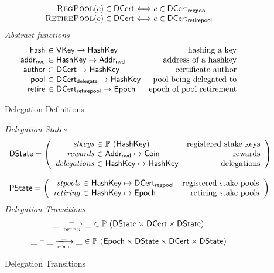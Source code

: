 \documentclass[11pt,a4paper]{article}
\newcommand{\powerset}[1]{\mathbb{P}~#1}
\newcommand{\var}[1]{\mathit{#1}}
\newcommand{\fun}[1]{\mathsf{#1}}
\newcommand{\type}[1]{\mathsf{#1}}
\newcommand{\trans}[2]{\xlongrightarrow[\textsc{#1}]{#2}}
\newcommand{\AddrRWD}{\type{Addr_{rwd}}}
\newcommand{\VKey}{\type{VKey}}
\newcommand{\HashKey}{\type{HashKey}}
\newcommand{\Coin}{\type{Coin}}
\newcommand{\Epoch}{\type{Epoch}}
\newcommand{\DState}{\type{DState}}
\newcommand{\PState}{\type{PState}}
\newcommand{\DCert}{\type{DCert}}
\newcommand{\DCertDeleg}{\type{DCert_{delegate}}}
\newcommand{\DCertRegPool}{\type{DCert_{regpool}}}
\newcommand{\DCertRetirePool}{\type{DCert_{retirepool}}}
\newcommand{\RegPool}[1]{\textsc{RegPool}(#1)}
\newcommand{\RetirePool}[1]{\textsc{RetirePool}(#1)}
\begin{document}
\begin{figure}
\begin{equation*}
\begin{array}{r@{}c@{}l}
    \RegPool{c} \in \DCert &\iff& c \in \DCertRegPool\\
    \RetirePool{c} \in \DCert &\iff& c \in \DCertRetirePool \\
  \end{array}
  \end{equation*}
  \emph{Abstract functions}
  \begin{equation*}
  \begin{array}{r@{~\in~}lr}
  \fun{hash} & \VKey \to \HashKey
  & \text{hashing a key}
  \\
  \fun{addr_{rwd}} & \HashKey \to \AddrRWD
  & \text{address of a hashkey}
  \\
  \fun{author} & \DCert \to \HashKey
  & \text{certificate author}
  \\
  \fun{pool} & \DCertDeleg \to \HashKey
  & \text{pool being delegated to}
  \\
  \fun{retire} & \DCertRetirePool \to \Epoch
  & \text{epoch of pool retirement}
  \end{array}
  \end{equation*}

  \caption{Delegation Definitions}
  \label{fig:delegation-definitons}
\end{figure}

\begin{figure}
  \emph{Delegation States}
  \begin{equation*}
    \begin{array}{l}
    \DState =
    \left(\begin{array}{r@{~\in~}lr}
      \var{stkeys} & \powerset (\HashKey) & \text{registered stake keys}\\
      \var{rewards} & \AddrRWD \mapsto \Coin & \text{rewards}\\
      \var{delegations} & \HashKey \mapsto \HashKey & \text{delegations}\\
    \end{array}\right)
    \\
    \\
    \PState =
    \left(\begin{array}{r@{~\in~}lr}
      \var{stpools} & \HashKey \mapsto \DCertRegPool & \text{registered stake pools}\\
      \var{retiring} & \HashKey \mapsto \Epoch & \text{retiring stake pools}\\
    \end{array}\right)
    \end{array}
  \end{equation*}
  \emph{Delegation Transitions}
  \begin{equation*}
    \_ \trans{deleg}{\_} \_ \in
      \powerset (\DState \times \DCert \times \DState)
  \end{equation*}
  \begin{equation*}
    \_ \vdash \_ \trans{pool}{\_} \_ \in
      \powerset (\Epoch \times \DState \times \DCert \times \DState)
  \end{equation*}
  \caption{Delegation Transitions}
  \label{fig:delegation-transitions}
\end{figure}
\end{document}
